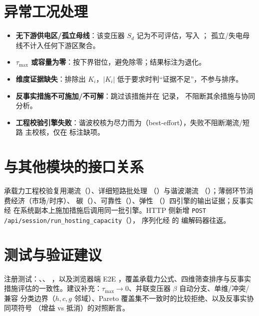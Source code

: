 \documentclass[UTF8,fontset=fandol,a4paper,11pt]{ctexart}
\begin{document}
\section{异常工况处理}
\begin{itemize}
  \item \textbf{无下游供电区/孤立母线}：该变压器 $S_d$ 记为不可评估，写入 ；
        孤立/失电母线不计入任何下游区聚合。
  \item \textbf{$\tau_{\max}$ 或容量为零}：按下界钳位，避免除零；结果标注为退化。
  \item \textbf{维度证据缺失}：排除出 $K_i$，$|K_i|$ 低于要求时判“证据不足”，不参与排序。
  \item \textbf{反事实措施不可施加/不可解}：跳过该措施并在  记录，
        不阻断其余措施与协同分析。
  \item \textbf{工程校验引擎失败}：谐波校核为尽力而为（best-effort），失败不阻断潮流/短路
        主校核，仅在  标注缺项。
\end{itemize}

\section{与其他模块的接口关系}
承载力工程校验复用潮流（）、详细短路批处理
（）与谐波潮流
（）；薄弱环节消费经济（市场/时序）、
碳（）、可靠性（）、弹性
（）四引擎的输出证据；反事实经 
在系统副本上施加措施后调用同一批引擎。HTTP 侧新增
\texttt{POST /api/session/run\_hosting\_capacity}（），
序列化经  的  编解码器往返。

\section{测试与验证建议}
注册测试：、、
，以及浏览器端 E2E
，覆盖承载力公式、四维筛查排序与反事实
措施评估的一致性。建议补充：$\tau_{\max}\to0$、并联变压器 $\beta$ 自动分支、单维/冲突/兼容
分类边界（$h,c,g$ 邻域）、Pareto 覆盖集不一致时的比较拒绝、以及反事实协同项符号
（增益 vs 抵消）的对照断言。
\end{document}
